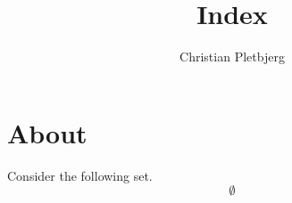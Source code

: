 \documentclass{article}
\title{Index}
\author{Christian Pletbjerg}
\begin{document}
\section{About}
Consider the following set.
\[
    \emptyset
\]

\end{document}
